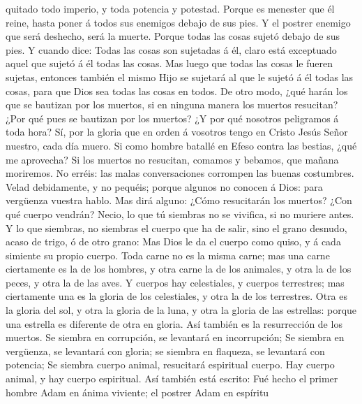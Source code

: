 quitado todo imperio, y toda potencia y potestad.  Porque
es menester que él reine, hasta poner á todos sus enemigos debajo de sus
pies.  Y el postrer enemigo que será deshecho, será la
muerte.  Porque todas las cosas sujetó debajo de sus
pies. Y cuando dice: Todas las cosas son sujetadas á él, claro está
exceptuado aquel que sujetó á él todas las cosas.  Mas
luego que todas las cosas le fueren sujetas, entonces también el mismo
Hijo se sujetará al que le sujetó á él todas las cosas, para que Dios
sea todas las cosas en todos.  De otro modo, ¿qué harán
los que se bautizan por los muertos, si en ninguna manera los muertos
resucitan? ¿Por qué pues se bautizan por los muertos?  ¿Y
por qué nosotros peligramos á toda hora?  Sí, por la
gloria que en orden á vosotros tengo en Cristo Jesús Señor nuestro, cada
día muero.  Si como hombre batallé en Efeso contra las
bestias, ¿qué me aprovecha? Si los muertos no resucitan, comamos y
bebamos, que mañana moriremos.  No erréis: las malas
conversaciones corrompen las buenas costumbres.  Velad
debidamente, y no pequéis; porque algunos no conocen á Dios: para
vergüenza vuestra hablo.  Mas dirá alguno: ¿Cómo
resucitarán los muertos? ¿Con qué cuerpo vendrán?  Necio,
lo que tú siembras no se vivifica, si no muriere antes. 
Y lo que siembras, no siembras el cuerpo que ha de salir, sino el grano
desnudo, acaso de trigo, ó de otro grano:  Mas Dios le da
el cuerpo como quiso, y á cada simiente su propio cuerpo.
 Toda carne no es la misma carne; mas una carne
ciertamente es la de los hombres, y otra carne la de los animales, y
otra la de los peces, y otra la de las aves.  Y cuerpos
hay celestiales, y cuerpos terrestres; mas ciertamente una es la gloria
de los celestiales, y otra la de los terrestres.  Otra es
la gloria del sol, y otra la gloria de la luna, y otra la gloria de las
estrellas: porque una estrella es diferente de otra en gloria.
 Así también es la resurrección de los muertos. Se
siembra en corrupción, se levantará en incorrupción;  Se
siembra en vergüenza, se levantará con gloria; se siembra en flaqueza,
se levantará con potencia;  Se siembra cuerpo animal,
resucitará espiritual cuerpo. Hay cuerpo animal, y hay cuerpo
espiritual.  Así también está escrito: Fué hecho el
primer hombre Adam en ánima viviente; el postrer Adam en espíritu
